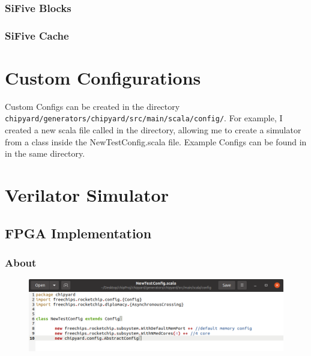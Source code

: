 \subsubsection{SiFive Blocks}\label{sec:SiFive_Blocks}
\subsubsection{SiFive Cache}\label{sec:SiFive_Cache}
\subsubsection{}\label{sec:testchipip}

\section{Custom Configurations}\label{sec:Custom_Configurations}
Custom Configs can be created in the directory \texttt{chipyard/generators/chipyard/src/main/scala/config/}.
For example, I created a new scala file called  in the directory, allowing me to create a simulator from a class inside the NewTestConfig.scala file.
Example Configs can be found in   in the same directory.


\section{Verilator Simulator}\label{sec:Verilator_Simulator}

\subsection{FPGA Implementation}\label{sec:FPGA_Implementation}


\subsubsection{About}\label{sec:About}

\begin{figure}[h!tbp]
  \centering
  \includegraphics[width=0.7\linewidth]{./NewTestConfig.png}
  \caption{}
  \label{fig:newtestconfig}
\end{figure}

